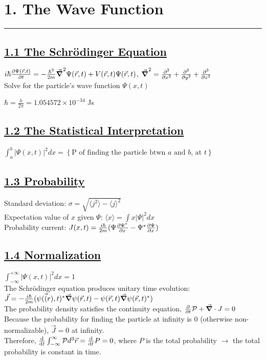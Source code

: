 \section{1. The Wave Function} \hrule height 0.3pt \thinspace

\subsection{\underline{1.1 The Schr\"{o}dinger Equation}}

$i \hbar \pdv{\Psi(\vec{r}, t)}{t} = -\frac{\hbar^2}{2m} \vec{\grad}^2 \Psi(\vec{r}, t) + V(\vec{r}, t) \Psi(\vec{r}, t)$,
$\vec{\grad}^2 = \pdv[2]{}{x} + \pdv[2]{}{y} + \pdv[3]{}{z}$ \\

Solve for the particle's wave function $\Psi(x, t)$

$\hbar = \frac{h}{2\pi} = 1.054572 \times 10^{-34}$ Js \\

\subsection{\underline{1.2 The Statistical Interpretation}}

$\int_{a}^{b} |\Psi(x, t)|^2 dx = \left\{ \textrm{P of finding the particle btwn $a$ and $b$, at $t$} \right\}$ \\

\subsection{\underline{1.3 Probability}}
Standard deviation: $\sigma = \sqrt{\langle j^2 \rangle - \langle j \rangle ^2}$ \\
Expectation value of $x$ given $\Psi$: $\langle x \rangle = \int x |\Psi|^2 dx$ \\
Probability current: $J(x, t)=\frac{i \hbar}{2m} (\Psi \pdv{\Psi^*}{x} - \Psi^* \pdv{\Psi}{x})$

\subsection{\underline{1.4 Normalization}}

$\int_{-\infty}^{+\infty} |\Psi (x, t)|^2 dx = 1$ \\

The Schr\"odinger equation produces unitary time evolution: \\
$\vec{J} = - \frac{i \hbar}{2m} (\psi(\vec(r), t)^* \vec{\grad} \psi(\vec{r}, t) - \psi(\vec{r}, t) \vec{\grad} \psi(\vec{r}, t)^*)$ \\
The probability density satisfies the continuity equation, $\pdv{}{t} \mathcal{P} + \vec{\grad} \cdot J = 0$ \\
Because the probability for finding the particle at infinity is 0 (otherwise non-normalizable), $\vec{J} = 0$ at infinity. \\
Therefore, $\dv{}{t} \int_{-\infty}^{\infty} \mathcal{P} d^3 \vec{r} = \dv{}{t} P = 0$, where $P$ is the total probability $\rightarrow$
the total probability is constant in time.

